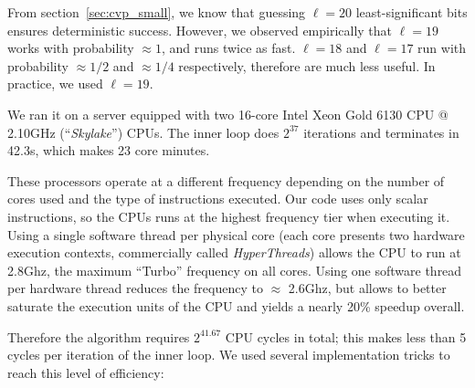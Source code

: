 \documentclass[journal=tosc,final]{iacrtrans}
\begin{document}
From section~\ref{sec:cvp_small}, we know that guessing $\ell=20$
least-significant bits ensures deterministic success. However, we observed
empirically that $\ell=19$ works with probability $\approx 1$, and runs twice as
fast. $\ell=18$ and $\ell=17$ run with probability $\approx 1/2$ and
$\approx 1/4$ respectively, therefore are much less useful. In practice, we used
$\ell=19$.

We ran it on a server equipped with two 16-core \textsf{Intel Xeon Gold 6130 CPU
  @ 2.10GHz} (``\emph{Skylake}'') CPUs. The inner loop does $2^{37}$ iterations
and terminates in 42.3s, which makes 23 core minutes.

These processors operate at a different frequency depending on the number of
cores used and the type of instructions executed. Our code uses only scalar
instructions, so the CPUs runs at the highest frequency tier when executing
it. Using a single software thread per physical core (each core presents two
hardware execution contexts, commercially called \emph{HyperThreads}) allows the
CPU to run at 2.8Ghz, the maximum ``Turbo'' frequency on all cores. Using one
software thread per hardware thread reduces the frequency to $\approx$ 2.6Ghz,
but allows to better saturate the execution units of the CPU and yields a nearly
20\% speedup overall.

Therefore the algorithm requires $2^{41.67}$ CPU cycles in total; this makes
less than 5 cycles per iteration of the inner loop. We used several
implementation tricks to reach this level of efficiency:
\end{document}
